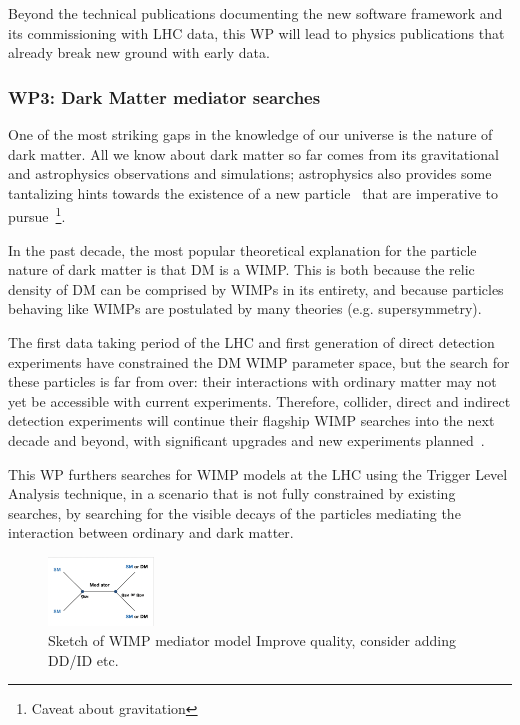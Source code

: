 \documentclass[11pt,a4paper]{article}
\begin{document}
Beyond the technical publications documenting the new software framework and its commissioning with LHC data, this WP will lead to physics publications that already break new ground with early data. 

\subsubsection*{WP3: Dark Matter mediator searches}

One of the most striking gaps in the knowledge of our universe is the nature of dark matter. All we know about dark matter so far comes from its gravitational and astrophysics observations and simulations; astrophysics also provides some tantalizing hints towards the existence of a new particle~\cite{HooperLeane} that are imperative to pursue~\footnote{Caveat about gravitation}. 

In the past decade, the most popular theoretical explanation for the particle nature of dark matter is that DM is a WIMP. This is both because the relic density of DM can be comprised by WIMPs in its entirety, and because particles behaving like WIMPs are postulated by many theories (e.g. supersymmetry)\cite{AR}. 

The first data taking period of the LHC and first generation of direct detection experiments have constrained the DM WIMP parameter space, but the search for these particles is far from over: their interactions with ordinary matter may not yet be accessible with current experiments. Therefore, collider, direct and indirect detection experiments will continue their flagship WIMP searches into the next decade and beyond, with significant upgrades and new experiments planned~\cite{Astro2020, EuropeanStrategy}. 

This WP furthers searches for WIMP models at the LHC using the Trigger Level Analysis technique, in a scenario that is not fully constrained by existing searches, by searching for the visible decays of the particles mediating the interaction between ordinary and dark matter. 

\begin{figure} \includegraphics[width=0.25\textwidth]{figs/WIMPMediator}
\caption{\label{fig:WIMPMediator} \small Sketch of WIMP mediator model \scriptsize \color{red} Improve quality, consider adding DD/ID etc. \color{black}}
\end{figure}
\end{document}
